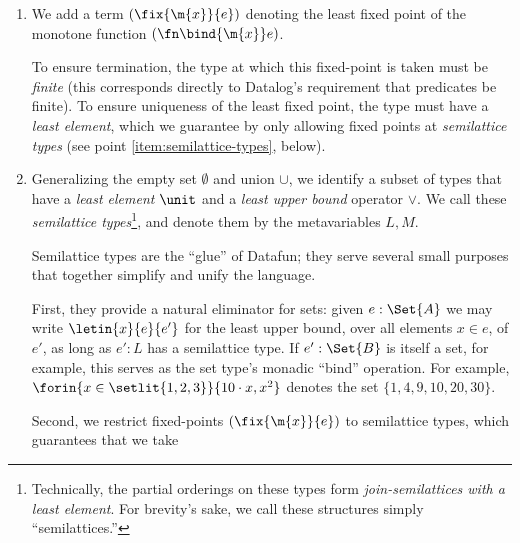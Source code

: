\begin{enumerate}
\item We add a term $(\fix{\m{x}}{e})$ denoting the least fixed point of the
  monotone function $(\fn\bind{\m{x}} e)$.


  To ensure termination, the type at which this fixed-point is taken must be
  \emph{finite} (this corresponds directly to Datalog's requirement that
  predicates be finite). To ensure uniqueness of the least fixed point, the type
  must have a \emph{least element}, which we guarantee by only allowing fixed
  points at \emph{semilattice types} (see point \ref{item:semilattice-types},
  below).

\item\label{item:semilattice-types} Generalizing the empty set $\emptyset$ and
  union $\cup$, we identify a subset of types that have a \emph{least element}
  $\unit$ and a \emph{least upper bound} operator $\vee$. We call these
  \emph{semilattice types}\footnote{Technically, the partial orderings on these
    types form \emph{join-semilattices with a least element}. For brevity's
    sake, we call these structures simply ``semilattices.''}, and denote them by
  the metavariables $L,M$.

  Semilattice types are the ``glue'' of Datafun; they serve several small
  purposes that together simplify and unify the language.

  First, they provide a natural eliminator for sets: given $e : \Set{A}$ we may
  write $\letin{x}{e}{e'}$ for the least upper bound, over all elements $x \in
  e$, of $e'$, as long as $e' : L$ has a semilattice type. If $e' : \Set{B}$ is
  itself a set, for example, this serves as the set type's monadic ``bind''
  operation. For example, $\forin{x \in \setlit{1,2,3}} \{10 \cdot x, x^2\}$
  denotes the set $\{1, 4, 9, 10, 20, 30\}$.


  Second, we restrict fixed-points $(\fix{\m{x}}{e})$ to semilattice types,
  which guarantees that we take



\end{enumerate}
